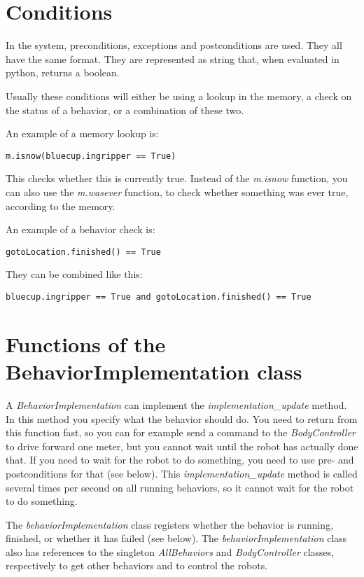 \documentclass[a4paper, 10pt, oneside]{article}
\newcommand{\cod}[1]{\emph{#1}}
\begin{document}
\section{Conditions}

In the system, preconditions, exceptions and postconditions are used. They all have the same format.
They are represented as string that, when evaluated in python, returns a boolean. 

Usually these conditions will either be using a lookup in the memory, a check on the status of a
behavior, or a combination of these two.

An example of a memory lookup is:
\begin{verbatim}
m.isnow(bluecup.ingripper == True)
\end{verbatim}
This checks whether this is currently true. Instead of the \cod{m.isnow} function, you can also
use the \cod{m.wasever} function, to check whether something was ever true, according to the memory.

An example of a behavior check is:
\begin{verbatim}
gotoLocation.finished() == True
\end{verbatim}

They can be combined like this:
\begin{verbatim}
bluecup.ingripper == True and gotoLocation.finished() == True
\end{verbatim}


\section{Functions of the BehaviorImplementation class}

A \cod{BehaviorImplementation} can implement the \cod{implementation\_update} method. In this method
you specify what the behavior should do. You need to return from this
function fast, so you can for example send a command to the \cod{BodyController} to drive forward
one meter, but you cannot wait until the robot has actually done that. If you need to wait for the
robot to do something, you need to use pre- and postconditions for that (see below). This
\cod{implementation\_update} method is called several times per second on all running behaviors, so
it cannot wait for the robot to do something.

The \cod{behaviorImplementation} class registers whether the behavior is running, finished, or
whether it has failed (see below). The \cod{behaviorImplementation} class also has references to the
singleton \cod{AllBehaviors} and \cod{BodyController} classes, respectively to get other behaviors
and to control the robots.
\end{document}
